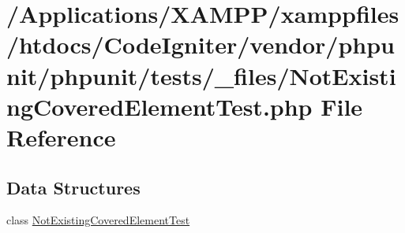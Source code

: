 \hypertarget{phpunit_2tests_2__files_2_not_existing_covered_element_test_8php}{}\section{/\+Applications/\+X\+A\+M\+P\+P/xamppfiles/htdocs/\+Code\+Igniter/vendor/phpunit/phpunit/tests/\+\_\+files/\+Not\+Existing\+Covered\+Element\+Test.php File Reference}
\label{phpunit_2tests_2__files_2_not_existing_covered_element_test_8php}
\subsection*{Data Structures}
\begin{DoxyCompactItemize}
\item 
class \mbox{\hyperlink{class_not_existing_covered_element_test}{Not\+Existing\+Covered\+Element\+Test}}
\end{DoxyCompactItemize}
